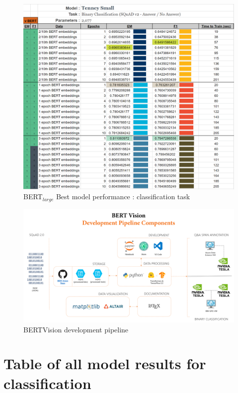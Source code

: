 \begin{figure}[h]
	\centering
	\includegraphics[width=\linewidth]{images/classification/TenneySmall_Training.png}%
	\caption{BERT$_{large}$ Best model performance : classification task}
\end{figure}

\newpage

\begin{figure}[t]
	\centering
	\includegraphics[width=\textwidth]{images/BERTVision_Development_PIpeline.png}%
	\caption{BERTVision development pipeline}
	\label{apdx:bertvision_development_pipeline_graph}
\end{figure}

\newpage

\section{Table of all model results for classification}
\label{apdx:classification_models_trained}


